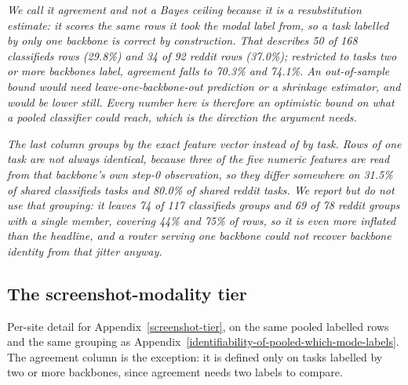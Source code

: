 \emph{We call it agreement and not a Bayes ceiling because it is a resubstitution estimate: it scores the same rows it took the modal label from, so a task labelled by only one backbone is correct by construction. That describes 50 of 168 classifieds rows (29.8\%) and 34 of 92 reddit rows (37.0\%); restricted to tasks two or more backbones label, agreement falls to 70.3\% and 74.1\%. An out-of-sample bound would need leave-one-backbone-out prediction or a shrinkage estimator, and would be lower still. Every number here is therefore an optimistic bound on what a pooled classifier could reach, which is the direction the argument needs.}

\emph{The last column groups by the exact feature vector instead of by task. Rows of one task are not always identical, because three of the five numeric features are read from that backbone's own step-0 observation, so they differ somewhere on 31.5\% of shared classifieds tasks and 80.0\% of shared reddit tasks. We report but do not use that grouping: it leaves 74 of 117 classifieds groups and 69 of 78 reddit groups with a single member, covering 44\% and 75\% of rows, so it is even more inflated than the headline, and a router serving one backbone could not recover backbone identity from that jitter anyway.}

\subsection{The screenshot-modality tier}\label{the-screenshot-modality-tier}

Per-site detail for Appendix~\ref{screenshot-tier}, on the same pooled labelled rows and the same grouping as Appendix~\ref{identifiability-of-pooled-which-mode-labels}. The agreement column is the exception: it is defined only on tasks labelled by two or more backbones, since agreement needs two labels to compare.


